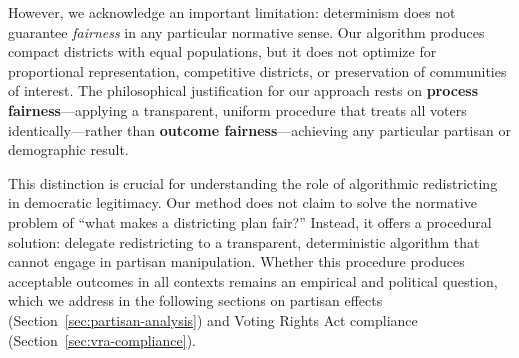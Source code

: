 However, we acknowledge an important limitation: determinism does not guarantee \textit{fairness} in any particular normative sense. Our algorithm produces compact districts with equal populations, but it does not optimize for proportional representation, competitive districts, or preservation of communities of interest. The philosophical justification for our approach rests on \textbf{process fairness}---applying a transparent, uniform procedure that treats all voters identically---rather than \textbf{outcome fairness}---achieving any particular partisan or demographic result.

This distinction is crucial for understanding the role of algorithmic redistricting in democratic legitimacy. Our method does not claim to solve the normative problem of ``what makes a districting plan fair?'' Instead, it offers a procedural solution: delegate redistricting to a transparent, deterministic algorithm that cannot engage in partisan manipulation. Whether this procedure produces acceptable outcomes in all contexts remains an empirical and political question, which we address in the following sections on partisan effects (Section~\ref{sec:partisan-analysis}) and Voting Rights Act compliance (Section~\ref{sec:vra-compliance}).

